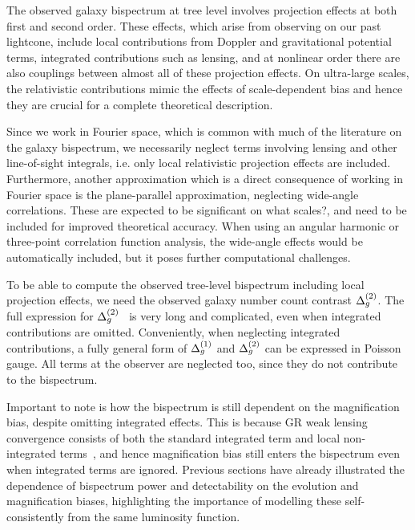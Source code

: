 The observed galaxy bispectrum at tree level involves projection effects at both first and second order. These effects, which arise from observing on our past lightcone, include local contributions from Doppler and gravitational potential terms, integrated contributions such as lensing, and at nonlinear order there are also couplings between almost all of these projection effects. On ultra-large scales, the relativistic contributions mimic the effects of scale-dependent bias and hence they are crucial for a complete theoretical description. 

Since we work in Fourier space, which is common with much of the literature on the galaxy bispectrum, we necessarily neglect terms involving lensing and other line-of-sight integrals, i.e. only local relativistic projection effects are included. Furthermore, another approximation which is a direct consequence of working in Fourier space is the plane-parallel approximation, neglecting wide-angle correlations. These are expected to be significant on what scales?, and need to be included for improved theoretical accuracy. When using an angular harmonic or three-point correlation function analysis, the wide-angle effects would be automatically included, but it poses further computational challenges. 

To be able to compute the observed tree-level bispectrum including local projection effects, we need the observed galaxy number count contrast $\Delta_g^{(2)}$. The full expression for $\Delta_g^{(2)}$~\cite{Bertacca:2014dra,Bertacca:2014wga,Bertacca:2014hwa,Yoo:2014sfa,DiDio:2014lka} is very long and complicated, even when integrated contributions are omitted. Conveniently, when neglecting integrated contributions, a fully general form of $\Delta_g^{(1)}$ and $\Delta_g^{(2)}$ can be expressed in Poisson gauge. All terms at the observer are neglected too, since they do not contribute to the bispectrum. 

Important to note is how the bispectrum is still dependent on the magnification bias, despite omitting integrated effects. This is because GR weak lensing convergence consists of both the standard integrated term and local non-integrated terms~\cite{Bonvin:2008ni}, and hence magnification bias still enters the bispectrum even when integrated terms are ignored. Previous sections have already illustrated the dependence of bispectrum power and detectability on the evolution and magnification biases, highlighting the importance of modelling these self-consistently from the same luminosity function. 

